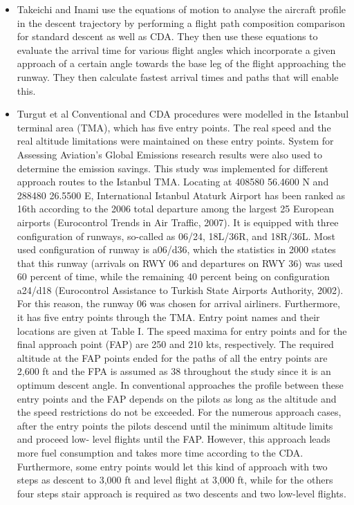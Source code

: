 \documentclass{aer1315-pretty}
\begin{document}
\begin{itemize}
\item Takeichi and Inami \cite{Takeichi:2010} use the equations of motion to analyse the aircraft profile in the descent trajectory by performing a flight path composition comparison for standard descent as well as CDA. They then use these equations to evaluate the arrival time for various flight angles which incorporate a given approach of a certain angle towards the base leg of the flight approaching the runway. They then calculate fastest arrival times and paths that will enable this.



\item Turgut et al \cite{Enis:2010}
Conventional and CDA procedures were modelled in the Istanbul terminal area (TMA), which has five entry points. The real speed and the real altitude limitations were maintained on these entry points. System for Assessing Aviation’s Global Emissions research results were also used to determine the emission savings. This study was implemented for different approach routes to
the Istanbul TMA. Locating at 408580 56.4600 N and
288480 26.5500 E, International Istanbul Ataturk Airport has
been ranked as 16th according to the 2006 total departure
among the largest 25 European airports (Eurocontrol Trends in
Air Traffic, 2007). It is equipped with three configuration of
runways, so-called as 06/24, 18L/36R, and 18R/36L. Most used
configuration of runway is a06/d36, which the statistics in 2000
states that this runway (arrivals on RWY 06 and departures on
RWY 36) was used 60 percent of time, while the remaining 40
percent being on configuration a24/d18 (Eurocontrol
Assistance to Turkish State Airports Authority, 2002). For
this reason, the runway 06 was chosen for arrival airliners.
Furthermore, it has five entry points through the TMA. Entry
point names and their locations are given at Table I. The speed
maxima for entry points and for the final approach point (FAP)
are 250 and 210 kts, respectively. The required altitude at the
FAP points ended for the paths of all the entry points are
2,600 ft and the FPA is assumed as 38 throughout the study since
it is an optimum descent angle.
   In conventional approaches the profile between these entry
points and the FAP depends on the pilots as long as the
altitude and the speed restrictions do not be exceeded. For
the numerous approach cases, after the entry points the pilots
descend until the minimum altitude limits and proceed low-
level flights until the FAP. However, this approach leads more
fuel consumption and takes more time according to the CDA.
Furthermore, some entry points would let this kind of
approach with two steps as descent to 3,000 ft and level flight
at 3,000 ft, while for the others four steps stair approach is
required as two descents and two low-level flights.


\end{itemize}
\end{document}

